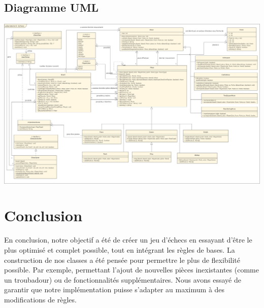 \documentclass[12pt]{article}
\begin{document}
\begin{landscape}
\thispagestyle{empty}
\newpage
\section{Diagramme UML}
\includegraphics[width=20cm]{uml.png}
\newpage
\end{landscape}

\section{Conclusion}

En conclusion, notre objectif a été de créer un jeu d'échecs en essayant d'être le plus optimisé et complet possible, tout en intégrant les règles de bases. La construction de nos classes a été pensée pour permettre le plus de flexibilité possible. Par exemple, permettant l'ajout de nouvelles pièces inexistantes (comme un troubadour) ou de fonctionnalités supplémentaires. Nous avons essayé de garantir que notre implémentation puisse s'adapter au maximum à des modifications de règles. 
\end{document}
